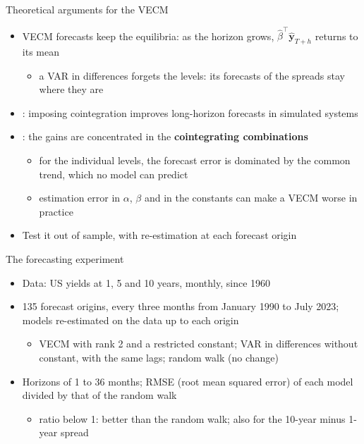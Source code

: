 \begin{frame}{Theoretical arguments for the VECM}
\itemsize{\small}
\begin{itemize}
    \item VECM forecasts keep the equilibria: as the horizon grows, $\hat\beta^\top\hat{\mathbf y}_{T+h}$ returns to its mean
    \begin{itemize}
        \item a VAR in differences forgets the levels: its forecasts of the spreads stay where they are
    \end{itemize}
    \item {}: imposing cointegration improves long-horizon forecasts in simulated systems
    \item {}: the gains are concentrated in the \textbf{cointegrating combinations}
    \begin{itemize}
        \item for the individual levels, the forecast error is dominated by the common trend, which no model can predict
        \item estimation error in $\alpha$, $\beta$ and in the constants can make a VECM worse in practice
    \end{itemize}
    \item Test it out of sample, with re-estimation at each forecast origin
\end{itemize}
\end{frame}

\begin{frame}{The forecasting experiment}
\itemsize{\small}
\begin{itemize}
    \item Data: US yields at 1, 5 and 10 years, monthly, since 1960
    \item 135 forecast origins, every three months from January 1990 to July 2023; models re-estimated on the data up to each origin
    \begin{itemize}
        \item VECM with rank 2 and a restricted constant; VAR in differences without constant, with the same lags; random walk (no change)
    \end{itemize}
    \item Horizons of 1 to 36 months; RMSE (root mean squared error) of each model divided by that of the random walk
    \begin{itemize}
        \item ratio below 1: better than the random walk; also for the 10-year minus 1-year spread
    \end{itemize}
\end{itemize}
\end{frame}

